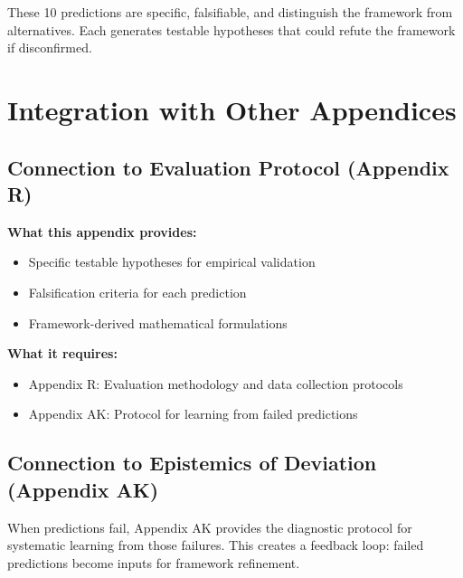 These 10 predictions are specific, falsifiable, and distinguish the framework from alternatives. Each generates testable hypotheses that could refute the framework if disconfirmed.


\section{Integration with Other Appendices}
\label{sec:S-integration}

\subsection{Connection to Evaluation Protocol (Appendix R)}

\begin{tcolorbox}[colback=yellow!5!white, colframe=yellow!75!black,
    title=Integration: Appendix S $\leftrightarrow$ Appendix R]
\textbf{What this appendix provides:}
\begin{itemize}[nosep]
\item Specific testable hypotheses for empirical validation
\item Falsification criteria for each prediction
\item Framework-derived mathematical formulations
\end{itemize}

\textbf{What it requires:}
\begin{itemize}[nosep]
\item Appendix R: Evaluation methodology and data collection protocols
\item Appendix AK: Protocol for learning from failed predictions
\end{itemize}
\end{tcolorbox}

\subsection{Connection to Epistemics of Deviation (Appendix AK)}

When predictions fail, Appendix AK provides the diagnostic protocol for systematic learning from those failures. This creates a feedback loop: failed predictions become inputs for framework refinement.



